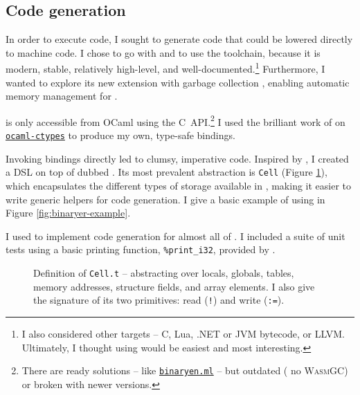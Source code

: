 \subsection{Code generation} 
\label{subsec:codegen}

In order to execute \fabric{} code, I sought to generate code that could be lowered directly to machine code. I chose to go with \wasm{} \cite{wasm} and to use the \binaryen{} \cite{binaryen} toolchain, because it is modern, stable, relatively high-level, and well-documented.\footnote{I also considered other targets -- C, Lua, .NET or JVM bytecode, or LLVM. Ultimately, I thought using \wasm{} would be easiest and most interesting.} Furthermore, I wanted to explore its new extension with garbage collection \cite{wasm-gc}, enabling automatic memory management for \fabric{}.

\binaryen{} is only accessible from OCaml using the C~API.\footnote{There are ready solutions -- like \href{https://github.com/grain-lang/binaryen.ml}{\texttt{binaryen.ml}} -- but outdated (\eg{} no \textsc{WasmGC}) or broken with newer \binaryen{} versions.} I used the brilliant work of \textcite{ocaml-ctypes} on \href{https://github.com/yallop/ocaml-ctypes}{\texttt{ocaml-ctypes}} to produce my own, type-safe bindings.

Invoking bindings directly led to clumsy, imperative code. Inspired by \textcite{offshoring-c}, I created a DSL on top of \binaryen{} dubbed \binaryendsl{}. Its most prevalent abstraction is \texttt{Cell} (Figure \ref{fig:cell-def}), which encapsulates the different types of storage available in \wasm{}, making it easier to write generic helpers for code generation.
I give a basic example of using \binaryendsl{} in Figure \ref{fig:binaryer-example}. 

I used \binaryendsl{} to implement code generation for almost all of \fabric{}. I included a suite of unit tests using a basic printing function, \texttt{\%print\_i32}, provided by \binaryen{}.

\begin{figure}[p]
    \centering
    
    \caption{Definition of \texttt{Cell.t} -- abstracting over locals, globals, tables, memory addresses, structure fields, and array elements. I also give the signature of its two primitives: read (\texttt{!}) and write (\texttt{:=}). 
    }
    \label{fig:cell-def}
\end{figure}

